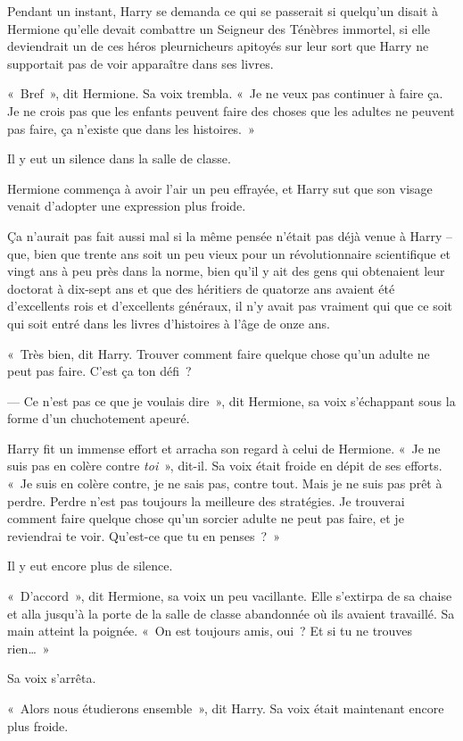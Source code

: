 Pendant un instant, Harry se demanda ce qui se passerait si quelqu'un disait à Hermione qu'elle devait combattre un Seigneur des Ténèbres immortel, si elle deviendrait un de ces héros pleurnicheurs apitoyés sur leur sort que Harry ne supportait pas de voir apparaître dans ses livres.

«~Bref~», dit Hermione.
Sa voix trembla.
«~Je ne veux pas continuer à faire ça.
Je ne crois pas que les enfants peuvent faire des choses que les adultes ne peuvent pas faire, ça n'existe que dans les histoires.~»

Il y eut un silence dans la salle de classe.

Hermione commença à avoir l'air un peu effrayée, et Harry sut que son visage venait d'adopter une expression plus froide.

Ça n'aurait pas fait aussi mal si la même pensée n'était pas déjà venue à Harry -- que, bien que trente ans soit un peu vieux pour un révolutionnaire scientifique et vingt ans à peu près dans la norme, bien qu'il y ait des gens qui obtenaient leur doctorat à dix-sept ans et que des héritiers de quatorze ans avaient été d'excellents rois et d'excellents généraux, il n'y avait pas vraiment qui que ce soit qui soit entré dans les livres d'histoires à l'âge de onze ans.

«~Très bien, dit Harry.
Trouver comment faire quelque chose qu'un adulte ne peut pas faire.
C'est ça ton défi~?

--- Ce n'est pas ce que je voulais dire~», dit Hermione, sa voix s'échappant sous la forme d'un chuchotement apeuré.

Harry fit un immense effort et arracha son regard à celui de Hermione.
«~Je ne suis pas en colère contre \emph{toi}~», dit-il.
Sa voix était froide en dépit de ses efforts.
«~Je suis en colère contre, je ne sais pas, contre tout.
Mais je ne suis pas prêt à perdre.
Perdre n'est pas toujours la meilleure des stratégies.
Je trouverai comment faire quelque chose qu'un sorcier adulte ne peut pas faire, et je reviendrai te voir.
Qu'est-ce que tu en penses~?~»

Il y eut encore plus de silence.

«~D'accord~», dit Hermione, sa voix un peu vacillante.
Elle s'extirpa de sa chaise et alla jusqu'à la porte de la salle de classe abandonnée où ils avaient travaillé.
Sa main atteint la poignée.
«~On est toujours amis, oui~?
Et si tu ne trouves rien…~»

Sa voix s'arrêta.

«~Alors nous étudierons ensemble~», dit Harry.
Sa voix était maintenant encore plus froide.

